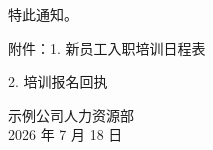 \documentclass[zihao=-4]{ctexart}   %
\begin{document}
特此通知。

\vspace{1ex}
\noindent\hspace{2\ccwd}附件：1. 新员工入职培训日程表\par
\noindent\hspace{2\ccwd}\hphantom{附件：}2. 培训报名回执

\vspace{2ex}
\noindent\hfill 示例公司人力资源部\hspace*{2\ccwd}\\
\mbox{}\hfill 2026 年 7 月 18 日\hspace*{2\ccwd}
\end{document}
